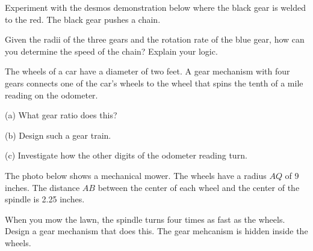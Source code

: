 \documentclass{ximera}
\begin{document}
\begin{question}  \label{Q1764:Angles}
Experiment with the desmos demonstration below where the black gear is welded to the red. The black gear pushes a chain.  

Given the radii of the three gears and the rotation rate of the blue gear, how can you determine the speed of the chain? Explain your logic.

 
\begin{onlineOnly}
    \begin{center}
\end{center}
\end{onlineOnly}
\end{question}







\begin{question}  \label{Q323342:Angles}
The wheels of a car have a diameter of two feet. A gear mechanism with four gears connects one of the car's wheels to the wheel that spins the tenth of a mile reading on the odometer.

(a) What gear ratio does this?

(b) Design such a gear train.

(c) Investigate how the other digits of the odometer reading turn.
\end{question}


\begin{question}    \label{Q850:Angles}
The photo below shows a mechanical mower. The wheels have a radius $AQ$ of 9 inches. The distance $AB$ between the center of each wheel and the center of the spindle is 2.25 inches. 

When you mow the lawn, the spindle turns four times as fast as the wheels. Design a gear mechanism that does this. The gear mehcanism is hidden inside the wheels.




 
\begin{onlineOnly}
    \begin{center}
\end{center}
\end{onlineOnly}
\end{question}
\end{document}
